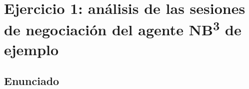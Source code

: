 \section{\texorpdfstring{Ejercicio 1: análisis de las sesiones de negociación del agente NB\textsuperscript{3} de ejemplo}{Ejercicio 1: análisis de las sesiones de negociación del agente NB3 de ejemplo}}
\label{sec:ej1}

\subsection*{Enunciado}

